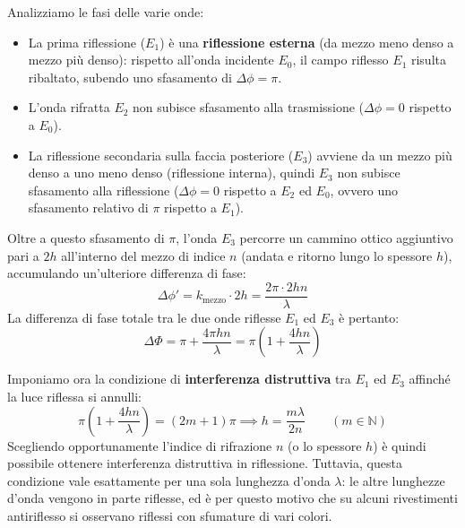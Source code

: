 \documentclass[openany,a4paper,12pt]{book}
\begin{document}
Analizziamo le fasi delle varie onde:
\begin{itemize}
    \item La prima riflessione ($E_1$) è una \textbf{riflessione esterna} (da mezzo meno denso a mezzo più denso): rispetto all'onda incidente $E_0$, il campo riflesso $E_1$ risulta ribaltato, subendo uno sfasamento di $\Delta\phi = \pi$.
    \item L'onda rifratta $E_2$ non subisce sfasamento alla trasmissione ($\Delta\phi = 0$ rispetto a $E_0$).
    \item La riflessione secondaria sulla faccia posteriore ($E_3$) avviene da un mezzo più denso a uno meno denso (riflessione interna), quindi $E_3$ non subisce sfasamento alla riflessione ($\Delta\phi = 0$ rispetto a $E_2$ ed $E_0$, ovvero uno sfasamento relativo di $\pi$ rispetto a $E_1$).
\end{itemize}

Oltre a questo sfasamento di $\pi$, l'onda $E_3$ percorre un cammino ottico aggiuntivo pari a $2h$ all'interno del mezzo di indice $n$ (andata e ritorno lungo lo spessore $h$), accumulando un'ulteriore differenza di fase:
\[
    \Delta\phi' = k_{\text{mezzo}} \cdot 2h = \frac{2\pi \cdot 2hn}{\lambda}
\]
La differenza di fase totale tra le due onde riflesse $E_1$ ed $E_3$ è pertanto:
\[
    \Delta\Phi = \pi + \frac{4\pi h n}{\lambda} = \pi \left(1 + \frac{4hn}{\lambda}\right)
\]

Imponiamo ora la condizione di \textbf{interferenza distruttiva} tra $E_1$ ed $E_3$ affinché la luce riflessa si annulli:
\[
    \pi\left(1 + \frac{4hn}{\lambda}\right) = (2m + 1)\pi \implies h = \frac{m\lambda}{2n} \qquad (m \in \mathbb{N})
\]
Scegliendo opportunamente l'indice di rifrazione $n$ (o lo spessore $h$) è quindi possibile ottenere interferenza distruttiva in riflessione. Tuttavia, questa condizione vale esattamente per una sola lunghezza d'onda $\lambda$: le altre lunghezze d'onda vengono in parte riflesse, ed è per questo motivo che su alcuni rivestimenti antiriflesso si osservano riflessi con sfumature di vari colori.
\end{document}
